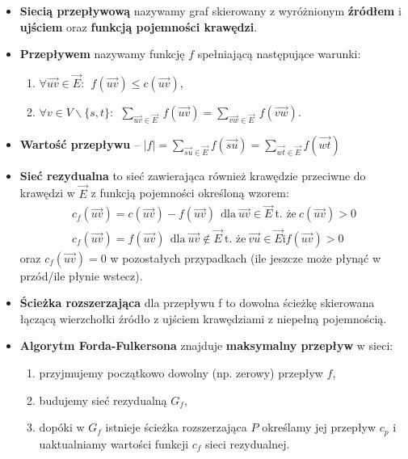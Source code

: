 \documentclass[main.tex]{subfiles}
\begin{document}
    \begin{itemize}
        \item \textbf{Siecią przepływową} nazywamy graf skierowany z wyróżnionym \textbf{źródłem} i \textbf{ujściem} oraz
        \textbf{funkcją pojemności krawędzi}.

        \item \textbf{Przepływem} nazywamy funkcję $f$ spełniającą następujące warunki:
        \begin{enumerate}
            \item $\forall \vec{uv} \in \vec{E}: ~~ f(\vec{uv}) \leq c(\vec{uv})$,
            \item $\forall v \in V \backslash \{s, t\}: ~~ \sum_{\vec{uv} \in \vec{E}} ~ f(\vec{uv}) = \sum_{\vec{vw} \in \vec{E}} ~ f(\vec{vw})$.
        \end{enumerate}

        \item \textbf{Wartość przepływu} -- $|f| =  \sum_{\vec{su}  \in \vec{E}} f(\vec{su}) = \sum_{\vec{wt} \in \vec{E}} f(\vec{wt})$

        \item \textbf{Sieć rezydualna} to sieć zawierająca również krawędzie przeciwne do krawędzi w $\vec{E}$ z funkcją
        pojemności określoną wzorem:
        \begin{gather*}
            c_f(\vec{uv}) = c(\vec{uv}) - f(\vec{uv}) ~~ \text{dla} ~ \vec{uv} \in  \vec{E} ~  \text{t. że} ~ c(\vec{uv}) > 0\\
            c_f(\vec{uv}) = f(\vec{uv}) ~~ \text{dla} ~ \vec{uv} \notin  \vec{E} ~  \text{t. że} ~ \vec{vu} \in \vec{E} \text{i} f(\vec{uv}) > 0
        \end{gather*}
        oraz $c_f(\vec{uv}) = 0$ w pozostałych przypadkach (ile jeszcze może płynąć w przód/ile płynie wstecz).

        \item \textbf{Ścieżka rozszerzająca} dla przepływu f to dowolna ścieżkę skierowana łączącą wierzchołki
        źródło z ujściem krawędziami z niepełną pojemnością.

        \item \textbf{Algorytm Forda-Fulkersona} znajduje \textbf{maksymalny przepływ} w sieci:
        \begin{enumerate}
            \item przyjmujemy początkowo dowolny (np. zerowy) przepływ $f$,
            \item budujemy sieć rezydualną $G_f$,
            \item dopóki w $G_f$ istnieje ścieżka rozszerzająca $P$ określamy jej przepływ $c_p$ i uaktualniamy wartości
            funkcji $c_f$ sieci rezydualnej.
        \end{enumerate}


\end{itemize}
\end{document}
